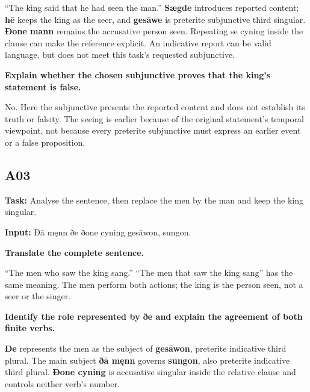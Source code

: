 “The king said that he had seen the man.” \textbf{Sægde} introduces reported content; \textbf{hē} keeps the king as the seer, and \textbf{gesāwe} is preterite subjunctive third singular. \textbf{Ðone mann} remains the accusative person seen. Repeating se cyning inside the clause can make the reference explicit. An indicative report can be valid language, but does not meet this task’s requested subjunctive.

\textbf{Explain whether the chosen subjunctive proves that the king’s statement is false.}

No. Here the subjunctive presents the reported content and does not establish its truth or falsity. The seeing is earlier because of the original statement’s temporal viewpoint, not because every preterite subjunctive must express an earlier event or a false proposition.

\subsection*{A03}

\textbf{Task:} Analyse the sentence, then replace the men by the man and keep the king singular.

\textbf{Input:} Ðā męnn ðe ðone cyning gesāwon, sungon.

\textbf{Translate the complete sentence.}

“The men who saw the king sang.” “The men that saw the king sang” has the same meaning. The men perform both actions; the king is the person seen, not a seer or the singer.

\textbf{Identify the role represented by ðe and explain the agreement of both finite verbs.}

\textbf{Ðe} represents the men as the subject of \textbf{gesāwon}, preterite indicative third plural. The main subject \textbf{ðā męnn} governs \textbf{sungon}, also preterite indicative third plural. \textbf{Ðone cyning} is accusative singular inside the relative clause and controls neither verb’s number.

